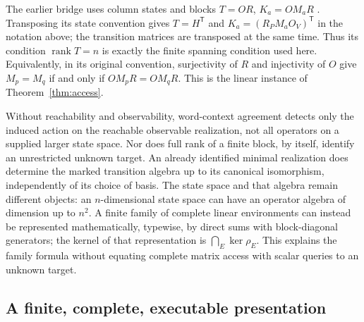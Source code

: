 \documentclass[11pt]{article}
\theoremstyle{definition}
\theoremstyle{remark}\newtheorem{remark}[theorem]{Remark}
\begin{document}
The earlier bridge uses column states and blocks $T=OR$,
$K_a=OM_aR$ \cite[``Finite-data realization compatibility'']{bridge-note}.
Transposing its state convention gives $T=H^{\mathsf T}$ and
$K_a=(R_PM_aO_V)^{\mathsf T}$ in the notation above; the transition
matrices are transposed at the same time. Thus its condition
$\operatorname{rank}T=n$ is exactly the finite spanning condition used
here. Equivalently, in its original convention, surjectivity of $R$ and
injectivity of $O$ give $M_p=M_q$ if and only if $OM_pR=OM_qR$.
This is the linear instance of Theorem~\ref{thm:access}.

Without reachability and observability, word-context agreement detects
only the induced action on the reachable observable realization, not all
operators on a supplied larger state space. Nor does full rank of a finite
block, by itself, identify an unrestricted unknown target. An already
identified minimal realization does determine the marked transition algebra
up to its canonical isomorphism, independently of its choice of basis.
The state space and that algebra remain different objects: an
$n$-dimensional state space can have an operator algebra of dimension up to
$n^2$. A finite family of complete linear environments can instead be
represented mathematically, typewise, by direct sums with block-diagonal
generators; the
kernel of that representation is $\bigcap_E\ker\rho_E$. This explains the
family formula without equating complete matrix access with scalar queries
to an unknown target.

\subsection{A finite, complete, executable presentation}
\end{document}
